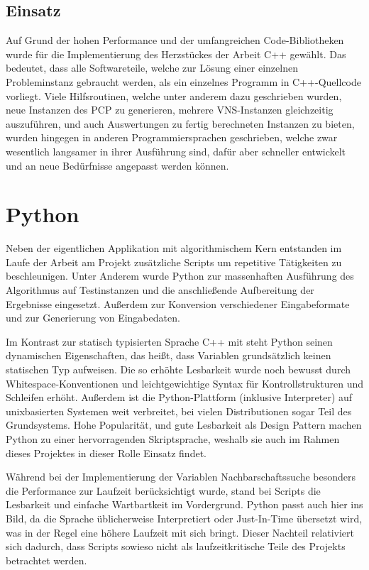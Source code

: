 \subsection{Einsatz}
Auf Grund der hohen Performance und der umfangreichen Code-Bibliotheken wurde für die Implementierung des Herzstückes der Arbeit C++ gewählt. Das bedeutet, dass alle Softwareteile, welche zur Lösung einer
einzelnen Probleminstanz gebraucht werden, als ein einzelnes Programm in C++-Quellcode vorliegt. Viele Hilfsroutinen, welche unter anderem dazu geschrieben wurden, neue Instanzen des PCP zu generieren, 
mehrere VNS-Instanzen gleichzeitig auszuführen, und auch Auswertungen zu fertig berechneten Instanzen zu bieten, wurden hingegen in anderen Programmiersprachen geschrieben, welche zwar wesentlich langsamer
in ihrer Ausführung sind, dafür aber schneller entwickelt und an neue Bedürfnisse angepasst werden können.

\section{Python}
\label{sec:python}
Neben der eigentlichen Applikation mit algorithmischem Kern entstanden im Laufe der Arbeit am Projekt zusätzliche Scripts um repetitive Tätigkeiten zu beschleunigen. Unter Anderem wurde Python zur massenhaften Ausführung des Algorithmus auf Testinstanzen und die anschließende Aufbereitung der Ergebnisse eingesetzt. Außerdem zur Konversion verschiedener Eingabeformate und zur Generierung von Eingabedaten.

Im Kontrast zur statisch typisierten Sprache C++ mit steht Python seinen dynamischen Eigenschaften, das heißt, dass Variablen grundsätzlich keinen statischen Typ aufweisen. Die so erhöhte Lesbarkeit wurde noch bewusst durch Whitespace-Konventionen und leichtgewichtige Syntax für Kontrollstrukturen und Schleifen erhöht. Außerdem ist die Python-Plattform (inklusive Interpreter) auf unixbasierten Systemen weit verbreitet, bei vielen Distributionen sogar Teil des Grundsystems. Hohe Popularität, und gute Lesbarkeit als Design Pattern machen Python zu einer hervorragenden Skriptsprache, weshalb sie auch im Rahmen dieses Projektes in dieser Rolle Einsatz findet.

Während bei der Implementierung der Variablen Nachbarschaftssuche besonders die Performance zur Laufzeit berücksichtigt wurde, stand bei Scripts die Lesbarkeit und einfache Wartbartkeit im Vordergrund. Python passt auch hier ins Bild, da die Sprache üblicherweise Interpretiert oder Just-In-Time übersetzt wird, was in der Regel eine höhere Laufzeit mit sich bringt. Dieser Nachteil relativiert sich dadurch, dass Scripts sowieso nicht als laufzeitkritische Teile des Projekts betrachtet werden.

